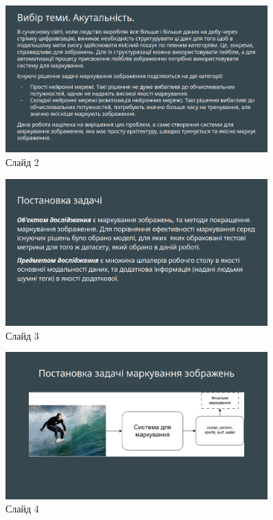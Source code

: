 \documentclass{udstu}
\begin{document}
\begin{figure}[!ht]
	\centering
	\includegraphics[width=0.9\textwidth]{PNG/present/present-2}
	\caption{Слайд 2}
\end{figure}

\begin{figure}[!ht]
	\centering
	\includegraphics[width=0.9\textwidth]{PNG/present/present-3}
	\caption{Слайд 3}
\end{figure}

\begin{figure}[!ht]
	\centering
	\includegraphics[width=0.9\textwidth]{PNG/present/present-4}
	\caption{Слайд 4}
\end{figure}
\end{document}
